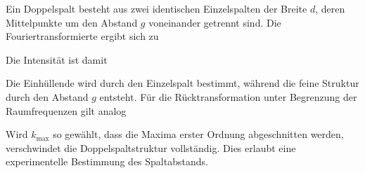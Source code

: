Ein Doppelspalt besteht aus zwei identischen Einzelspalten der Breite \( d \), deren Mittelpunkte um den Abstand \( g \) voneinander getrennt sind. Die Fouriertransformierte ergibt sich zu


Die Intensität ist damit


Die Einhüllende wird durch den Einzelspalt bestimmt, während die feine Struktur durch den Abstand \( g \) entsteht. Für die Rücktransformation unter Begrenzung der Raumfrequenzen gilt analog


Wird \( k_{\text{max}} \) so gewählt, dass die Maxima erster Ordnung abgeschnitten werden, verschwindet die Doppelspaltstruktur vollständig. Dies erlaubt eine experimentelle Bestimmung des Spaltabstands.

